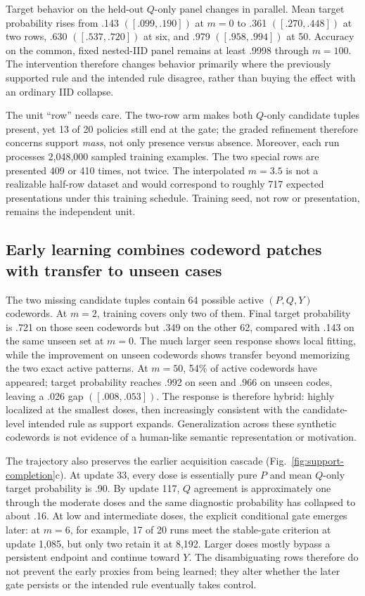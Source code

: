 \documentclass[11pt,a4paper]{article}
\newcommand{\fig}[1]{Fig.~\ref{#1}}
\begin{document}
Target behavior on the held-out $Q$-only panel changes in parallel. Mean target probability rises from .143 $([.099,.190])$ at $m=0$ to .361 $([.270,.448])$ at two rows, .630 $([.537,.720])$ at six, and .979 $([.958,.994])$ at 50. Accuracy on the common, fixed nested-IID panel remains at least .9998 through $m=100$. The intervention therefore changes behavior primarily where the previously supported rule and the intended rule disagree, rather than buying the effect with an ordinary IID collapse.

The unit ``row'' needs care. The two-row arm makes both $Q$-only candidate tuples present, yet 13 of 20 policies still end at the gate; the graded refinement therefore concerns support \emph{mass}, not only presence versus absence. Moreover, each run processes 2,048,000 sampled training examples. The two special rows are presented 409 or 410 times, not twice. The interpolated $m=3.5$ is not a realizable half-row dataset and would correspond to roughly 717 expected presentations under this training schedule. Training seed, not row or presentation, remains the independent unit.

\subsection*{Early learning combines codeword patches with transfer to unseen cases}

The two missing candidate tuples contain 64 possible active $(P,Q,Y)$ codewords. At $m=2$, training covers only two of them. Final target probability is .721 on those seen codewords but .349 on the other 62, compared with .143 on the same unseen set at $m=0$. The much larger seen response shows local fitting, while the improvement on unseen codewords shows transfer beyond memorizing the two exact active patterns. At $m=50$, 54\% of active codewords have appeared; target probability reaches .992 on seen and .966 on unseen codes, leaving a .026 gap $([.008,.053])$. The response is therefore hybrid: highly localized at the smallest doses, then increasingly consistent with the candidate-level intended rule as support expands. Generalization across these synthetic codewords is not evidence of a human-like semantic representation or motivation.

The trajectory also preserves the earlier acquisition cascade (\fig{fig:support-completion}c). At update 33, every dose is essentially pure $P$ and mean $Q$-only target probability is .90. By update 117, $Q$ agreement is approximately one through the moderate doses and the same diagnostic probability has collapsed to about .16. At low and intermediate doses, the explicit conditional gate emerges later: at $m=6$, for example, 17 of 20 runs meet the stable-gate criterion at update 1,085, but only two retain it at 8,192. Larger doses mostly bypass a persistent endpoint and continue toward $Y$. The disambiguating rows therefore do not prevent the early proxies from being learned; they alter whether the later gate persists or the intended rule eventually takes control.
\end{document}
